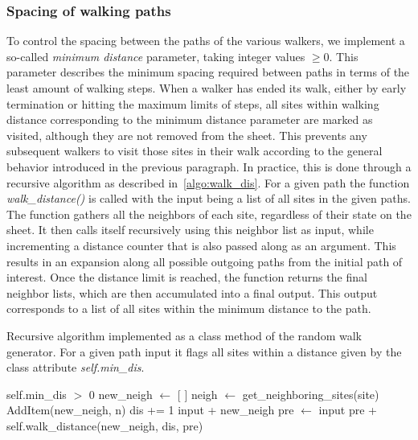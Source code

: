 \subsubsection{Spacing of walking paths} %
To control the spacing between the paths of the various walkers, we implement a so-called \textit{minimum distance} parameter, taking integer values $\ge 0$. This parameter describes the minimum spacing required between paths in terms of the least amount of walking steps. When a walker has ended its walk, either by early termination or hitting
the maximum limits of steps, all sites within walking distance corresponding to the minimum distance parameter are marked as visited, although they are not removed from the sheet.
This prevents any subsequent walkers to visit those sites in their walk
according to the general behavior introduced in the previous paragraph. In
practice, this is done through a recursive algorithm as described in~\cref{algo:walk_dis}. For a given path the function \textit{walk\_distance()} is called with the input being a list of all sites in the given paths. The function gathers all the neighbors of each site, regardless of their state on the sheet. It then calls itself recursively using this neighbor list as input, while incrementing a distance counter that is also passed along as an argument. This results in an expansion along all possible outgoing paths from the initial path of interest. Once the distance limit is reached, the function returns the final neighbor lists, which are then accumulated into a final output. This output corresponds to a list of all sites within the minimum distance to the path.


\begin{algorithm}[!htb]
  \caption{Recursive algorithm implemented as a class method of the random walk generator. For a given path input it flags all sites within a distance given by the class attribute \textit{self.min\_dis}.}
  \label{algo:walk_dis}
  \begin{algorithmic}[1]
    \Require self.min\_dis $>$ 0 
      \State new\_neigh $\gets$ [ ] 
        \State neigh $\gets$ get\_neighboring\_sites(site) 
           
            \State AddItem(new\_neigh, n) 
          \EndIf
        \EndFor
      \EndFor
      \State dis += 1 
       
        \State \Return input + new\_neigh 
      \Else {}
        \State pre $\gets$ input
        \State \Return pre +  self.walk\_distance(new\_neigh, dis, pre)
      \EndIf
    \EndFunction
  \end{algorithmic}
\end{algorithm}



